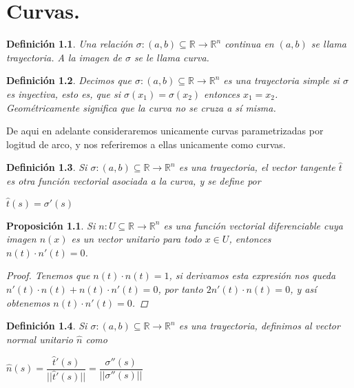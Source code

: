 \documentclass{book}
\newtheorem{proposition}{Proposición}[section]
\newtheorem{definition}{Definición}[section]
\begin{document}
\chapter{Curvas.}

\begin{definition}
Una relación $\sigma:(a,b)\subseteq \mathbb{R} \rightarrow \mathbb{R}^n$ continua en $(a,b)$ se llama trayectoria. A la imagen de $\sigma$ se le llama curva.
\end{definition}

\begin{definition}
Decimos que $\sigma:(a,b)\subseteq \mathbb{R} \rightarrow \mathbb{R}^n$ es una trayectoria simple si $\sigma$ es inyectiva, esto es, que si $\sigma(x_1)=\sigma(x_2)$ entonces $x_1=x_2$. Geométricamente significa que la curva no se cruza a sí misma.
\end{definition}




De aqui en adelante consideraremos unicamente curvas parametrizadas por logitud de arco, y nos referiremos a ellas unicamente como curvas.

\begin{definition}
Si $\sigma:(a,b)\subseteq \mathbb{R} \rightarrow \mathbb{R}^n$ es una trayectoria, el vector tangente $\widehat{t}$ es otra función vectorial asociada a la curva, y se define por
\begin{center}
    $\widehat{t}(s)=\sigma '(s)$
\end{center}
\end{definition}

\begin{proposition}
Si $n:U\subseteq \mathbb{R} \rightarrow \mathbb{R}^n$ es una función vectorial diferenciable cuya imagen $n(x)$ es un vector unitario para todo $x \in U$, entonces $n(t)\cdot n'(t)=0$.
\begin{proof}
 Tenemos que $n(t)\cdot n(t)=1$, si derivamos esta expresión nos queda $n'(t)\cdot n(t)+n(t)\cdot n'(t)=0$, por tanto $2n'(t)\cdot n(t)=0$, y así obtenemos $n(t)\cdot n'(t)=0$.
\end{proof}
\end{proposition}

\begin{definition}
Si $\sigma:(a,b)\subseteq \mathbb{R} \rightarrow \mathbb{R}^n$ es una trayectoria, definimos al vector normal unitario $\widehat{n}$ como
\begin{center}
    $\widehat{n}(s)=\dfrac{\widehat{t} '(s)}{||\widehat{t} '(s)||}=\dfrac{\sigma ''(s)}{||\sigma ''(s)||}$
\end{center}
\end{definition}
\end{document}
